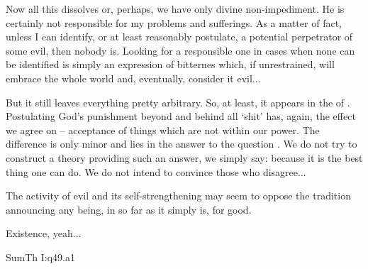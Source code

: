 Now all this dissolves or, perhaps, we have only divine non-impediment. He is
certainly not responsible for my problems and sufferings. As a matter of
fact, unless I can identify, or at least reasonably postulate, a potential
perpetrator of some evil, then nobody is. Looking for a responsible one in cases
when none can be identified is simply an expression of bitternes which, if
unrestrained, will embrace the whole world and, eventually, consider it evil...

But it still leaves everything pretty arbitrary. So, at least, it appears in the 
 of . Postulating God's punishment beyond and
behind all `shit' has, again, the effect we agree on --  acceptance
of things which are not within our power. The difference is only minor and lies
in the answer to the question . We do not try to construct a theory
providing such an answer, we simply say: because it is the best thing one can
do. We do not intend to convince those who disagree...
      





The activity of evil and its self-strengthening may seem to oppose the tradition
announcing any being, in so far as it simply is, for good. 


Existence, yeah...

\citet{It must be said that every evil in some way has a cause.
For evil is the absence of the good, which is natural and due to a thing. But
that anything fail from its natural and due disposition can come only from some
cause drawing it out of its proper disposition. For a heavy thing is not moved
upwards except by some impelling force; nor does an agent fail in its action
except from some impediment. But only good can be a cause; because nothing can
be a cause except inasmuch as it is a being, and every being, as such, is good.}
{SumTh}{ I:q49.a1}

